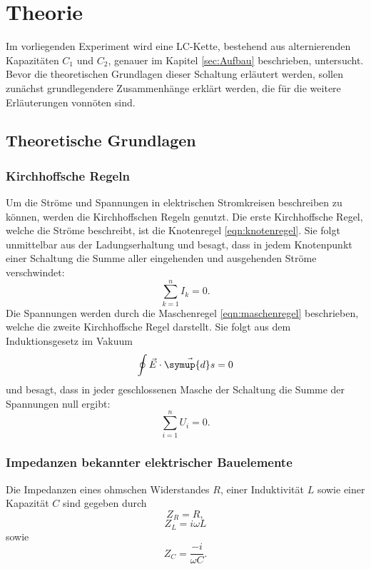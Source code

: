 \section{Theorie}
Im vorliegenden Experiment wird eine LC-Kette, bestehend aus alternierenden Kapazitäten $C_1$ und $C_2$, genauer im Kapitel \ref{sec:Aufbau} beschrieben, untersucht.
Bevor die theoretischen Grundlagen dieser Schaltung erläutert werden, sollen zunächst grundlegendere Zusammenhänge erklärt werden, die für die weitere Erläuterungen vonnöten sind.
\label{sec:Theorie}
\subsection{Theoretische Grundlagen}
\subsubsection{Kirchhoffsche Regeln}
Um die Ströme und Spannungen in elektrischen Stromkreisen beschreiben zu können, werden die Kirchhoffschen Regeln genutzt.
Die erste Kirchhoffsche Regel, welche die Ströme beschreibt, ist die Knotenregel \eqref{eqn:knotenregel}.
Sie folgt unmittelbar aus der Ladungserhaltung und besagt, dass in jedem Knotenpunkt einer Schaltung die Summe aller eingehenden und ausgehenden Ströme verschwindet:
\begin{equation}
  \sum_{k=1}^n I_k = 0.
  \label{eqn:knotenregel}
\end{equation}
Die Spannungen werden durch die Maschenregel \eqref{eqn:maschenregel} beschrieben, welche die zweite Kirchhoffsche Regel darstellt.
Sie folgt aus dem Induktionsgesetz im Vakuum
\begin{align*}
\oint \vec{E} \cdot \vec{\symup{d}s} = 0
\end{align*}
und besagt, dass in jeder geschlossenen Masche der Schaltung die Summe der Spannungen null ergibt:
\begin{equation}
  \sum_{i=1}^n U_i = 0.
  \label{eqn:maschenregel}
\end{equation}
\subsubsection{Impedanzen bekannter elektrischer Bauelemente}
\label{sec:impedanzen}
Die Impedanzen eines ohmschen Widerstandes $R$, einer Induktivität $L$ sowie einer Kapazität $C$ sind gegeben durch
\begin{equation}
  Z_R = R,
\end{equation}
\begin{equation}
  Z_L = i \omega L
\end{equation}
sowie
\begin{equation}
  Z_C = \frac{-i}{\omega C}.
\end{equation}

